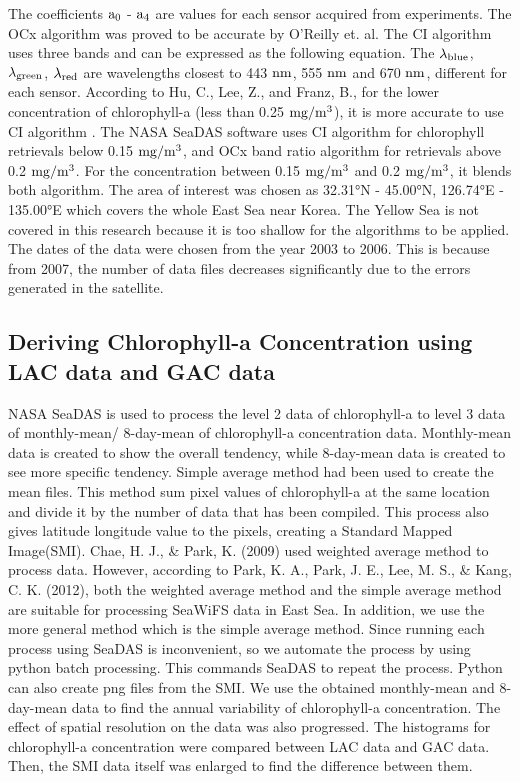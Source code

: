 The coefficients $\rm a_0$ - $\rm a_4$ are values for each sensor acquired from experiments. The OCx algorithm was proved to be accurate by O’Reilly et. al\cite{o2000ocean}. The CI algorithm uses three bands and can be expressed as the following equation.
The $\rm {\lambda}_{blue}$, $\rm {\lambda}_{green}$, $\rm {\lambda}_{red}$ are wavelengths closest to 443 $\rm nm$, 555 $\rm nm$ and 670 $\rm nm$, different for each sensor. According to Hu, C., Lee, Z., and Franz, B., for the lower concentration of chlorophyll-a (less than 0.25 $\rm mg/m^3$), it is more accurate to use CI algorithm \cite{hu2012chlorophyll}. The NASA SeaDAS software uses CI algorithm for chlorophyll retrievals below 0.15 $\rm mg/m^3$, and OCx band ratio algorithm for retrievals above 0.2 $\rm mg/m^3$. For the concentration between 0.15 $\rm mg/m^3$ and 0.2 $\rm mg/m^3$, it blends both algorithm.
The area of interest was chosen as 32.31°N - 45.00°N, 126.74°E - 135.00°E which covers the whole East Sea near Korea. The Yellow Sea is not covered in this research because it is too shallow for the algorithms to be applied. The dates of the data were chosen from the year 2003 to 2006. This is because from 2007, the number of data files decreases significantly due to the errors generated in the satellite. 


 \subsection{Deriving Chlorophyll-a Concentration using LAC data and GAC data}
 
  NASA SeaDAS is used to process the level 2 data of chlorophyll-a to level 3 data of monthly-mean/ 8-day-mean of chlorophyll-a concentration data. Monthly-mean data is created to show the overall tendency, while 8-day-mean data is created to see more specific tendency. Simple average method had been used to create the mean files. This method sum pixel values of chlorophyll-a at the same location and divide it by the number of data that has been compiled. This process also gives latitude longitude value to the pixels, creating a Standard Mapped Image(SMI). Chae, H. J., \& Park, K. (2009) used weighted average method to process data. However, according to Park, K. A., Park, J. E., Lee, M. S., \& Kang, C. K. (2012), both the weighted average method and the simple average method are suitable for processing SeaWiFS data in East Sea. In addition, we use the more general method which is the simple average method.
 Since running each process using SeaDAS is inconvenient, so we automate the process by using python batch processing. This commands SeaDAS to repeat the process. Python can also create png files from the SMI. We use the obtained monthly-mean and 8-day-mean data to find the annual variability of chlorophyll-a concentration.
 The effect of spatial resolution on the data was also progressed. The histograms for chlorophyll-a concentration were compared between LAC data and GAC data. Then, the SMI data itself was enlarged to find the difference between them.
 
 
 